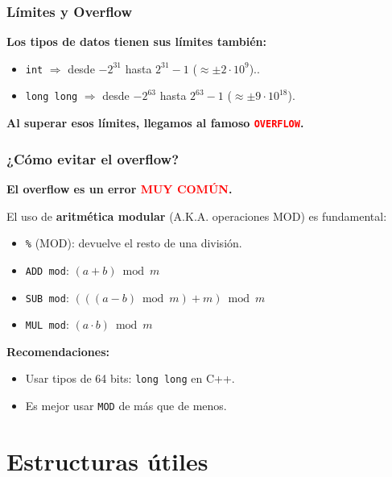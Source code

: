 \documentclass{beamer}
\begin{document}
\begin{frame}
  \frametitle{Límites y Overflow}

  \textbf{Los tipos de datos tienen sus límites también:}

  \begin{itemize}
    \item \texttt{int} $\Rightarrow$ desde $-2^{31}$ hasta $2^{31}-1$ ($\approx \pm 2 \cdot 10^{9}$)..
    \item \texttt{long long} $\Rightarrow$ desde $-2^{63}$ hasta $2^{63}-1$ ($\approx \pm 9 \cdot 10^{18}$).
  \end{itemize}

  \vspace{0.3cm}
  \textbf{Al superar esos límites, llegamos al famoso \textcolor{red}{\texttt{OVERFLOW}}.}

\end{frame}


\begin{frame}
  \frametitle{¿Cómo evitar el overflow?}

  \textbf{El overflow es un error \textcolor{red}{MUY COMÚN}.}

  \vspace{0.2cm}
  El uso de \textbf{aritmética modular} (A.K.A. operaciones MOD) es fundamental:  

  \begin{itemize}
    \item \texttt{\%} (MOD): devuelve el resto de una división.
    \item \texttt{ADD mod}: $(a + b) \bmod m$
    \item \texttt{SUB mod}: $(((a - b) \bmod m) + m ) \bmod m$
    \item \texttt{MUL mod}: $(a \cdot b) \bmod m$
  \end{itemize}

  \vspace{0.2cm}
  \textbf{Recomendaciones:}
  \begin{itemize}
    \item Usar tipos de 64 bits: \texttt{long long} en C++.
    \item Es mejor usar \texttt{MOD} de más que de menos.
  \end{itemize}

\end{frame}



\section{Estructuras útiles}
\end{document}

